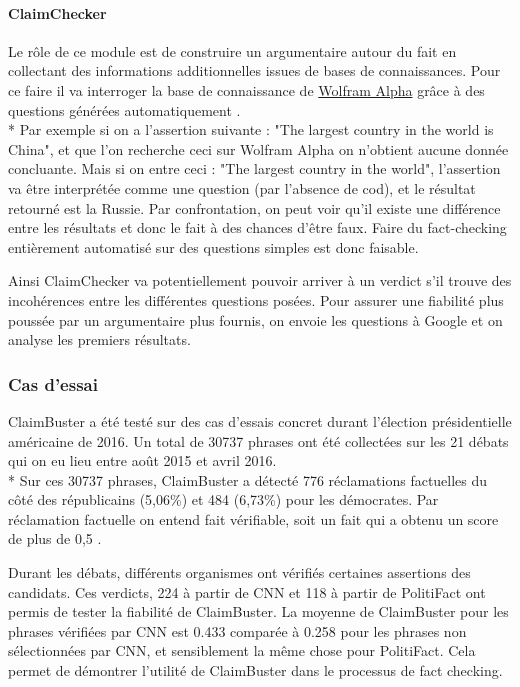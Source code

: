 \paragraph{ClaimChecker}

Le rôle de ce module est de construire un argumentaire autour du fait en collectant des informations additionnelles issues de bases de connaissances. Pour ce faire il va interroger la base de connaissance de \href{https://www.wolframalpha.com/about.html}{Wolfram Alpha} grâce à des questions générées automatiquement \cite{heilman2009question}. 
\\*
Par exemple si on a l'assertion suivante : "The largest country in the world is China", et que l'on recherche ceci sur Wolfram Alpha on n'obtient aucune donnée concluante. Mais si on entre ceci : "The largest country in the world", l'assertion va être interprétée comme une question (par l'absence de cod), et le résultat retourné est la Russie. Par confrontation, on peut voir qu'il existe une différence entre les résultats et donc le fait à des chances d'être faux. Faire du fact-checking entièrement automatisé sur des questions simples est donc faisable.

Ainsi ClaimChecker va potentiellement pouvoir arriver à un verdict s'il trouve des incohérences entre les différentes questions posées. Pour assurer une fiabilité plus poussée par un argumentaire plus fournis, on envoie les questions à Google et on analyse les premiers résultats.

\subsubsection{Cas d'essai}

ClaimBuster a été testé sur des cas d'essais concret durant l'élection présidentielle américaine de 2016. Un total de 30737 phrases ont été collectées sur les 21 débats qui on eu lieu entre août 2015 et avril 2016.
\\*
Sur ces 30737 phrases, ClaimBuster a détecté 776 réclamations factuelles du côté des républicains (5,06\%) et 484 (6,73\%) pour les démocrates. Par réclamation factuelle on entend fait vérifiable, soit un fait qui a obtenu un score de plus de 0,5 \cite{hassan2017toward}.

Durant les débats, différents organismes ont vérifiés certaines assertions des candidats. Ces verdicts, 224 à partir de CNN et 118 à partir de PolitiFact ont permis de tester la fiabilité de ClaimBuster. La moyenne de ClaimBuster pour les phrases vérifiées par CNN est 0.433 comparée à 0.258 pour les phrases non sélectionnées par CNN, et sensiblement la même chose pour PolitiFact. Cela permet de démontrer l'utilité de ClaimBuster dans le processus de fact checking.

